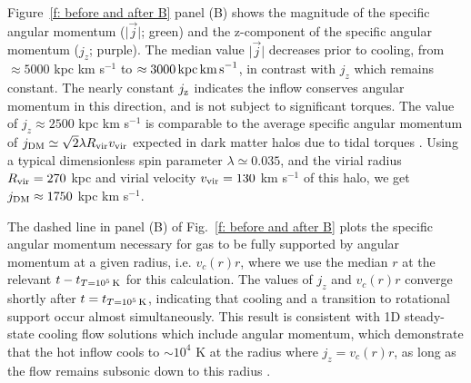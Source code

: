 \documentclass[fleqn,usenatbib]{mnras}
\newcommand{\tcon}{t_{T=10^5\,{\rm K}}}
\newcommand{\Rvir}{R_{\rm vir}}
\newcommand{\vvir}{v_{\rm vir}}
\begin{document}
Figure~\ref{f: before and after B} panel (B) shows the magnitude of the specific angular momentum ($\vert \vec j \vert$; green) and the z-component of the specific angular momentum ($j_z$; purple).
The median value $\vert \vec j \vert$ decreases prior to cooling, from $\approx 5000$ kpc km s$^{-1}$ to $\approx 3000\,{\rm kpc\,km\,s}^{-1}$, in contrast with  $j_z$ which remains constant. The nearly constant $j_{\rm z}$ indicates the inflow conserves angular momentum in this direction, and is not subject to significant torques. 
The value of $j_z\approx 2500$ kpc km s$^{-1}$ is comparable to the average specific angular momentum of $j_{\rm DM} \simeq \sqrt{2}\lambda \Rvir \vvir$ expected in dark matter halos due to tidal torques \citep[e.g.][]{Bullock2001}. Using a typical dimensionless spin parameter $\lambda \simeq 0.035$, and the virial radius $\Rvir=270$ kpc and virial velocity $\vvir=130$ km s$^{-1}$ of this halo, we get $j_{\rm DM}\approx1750$ kpc km s$^{-1}$. 

The dashed line in panel (B) of Fig.~\ref{f: before and after B} plots the specific angular momentum necessary for gas to be fully supported by angular momentum at a given radius, i.e. $v_c(r)r$, where we use the median $r$ at the relevant $t-\tcon$ for this calculation. 
The values of $j_z$ and $v_c(r)r$ converge shortly after $t=\tcon$, indicating that cooling and a transition to rotational support occur almost simultaneously. This result is consistent with 1D steady-state  cooling flow solutions which include angular momentum, which demonstrate that the hot inflow cools to $\sim10^4$ K at the radius where $j_z=v_c(r)r$, as long as the flow remains subsonic down to this radius \citep{Stern2020a}.

\end{document}
